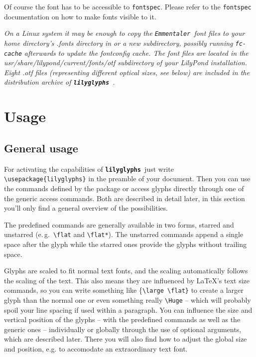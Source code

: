 \documentclass{article}
\newcommand*{\lilyglyphs}{\texttt{\textbf{lilyglyphs\,}}}
\newcommand*{\emmentaler}{\texttt{\textit{Emmentaler }}}
\newcommand*{\cmd}[1]{\texttt{\textbackslash #1}}
\begin{document}
Of course the font has to be accessible to \texttt{fontspec}. 
Please refer to the \texttt{fontspec} documentation on how to make fonts visible to it. 

\textit{On a Linux system it may be enough to copy the \emmentaler font files to your home directory's .fonts directory in or a new subdirectory, possibly running \texttt{fc-cache} afterwards to update the fontconfig cache. 
The font files are located in the usr/share/lilypond/current/fonts/otf subdirectory of your LilyPond installation. 
Eight .otf files (representing different optical sizes, see below) are included in the distribution archive of \lilyglyphs.}



\section{Usage}
\label{sec:usage}
\subsection{General usage}
\label{subsec:general_usage}
For activating the capabilities of \lilyglyphs just write \cmd{usepackage\{lilyglyphs\}} in the preamble of your document. 
Then you can use the commands defined by the package or access glyphs directly through one of the generic access commands.
Both are described in detail later, in this section you'll only find a general overview of the possibilities.

The predefined commands are generally available in two forms, starred and unstarred (e.\,g.\ \cmd{flat} and \cmd{flat*}). 
The unstarred commands append a single space after the glyph while the starred ones provide the glyphs without trailing space. 

Glyphs are scaled to fit normal text fonts, and the scaling automatically follows the scaling of the text. 
This also means they are influenced by \LaTeX 's text size commands, so you can write something like \{\cmd{large \textbackslash flat\}} to create a larger {\large \flat}glyph than the normal \flat one or even something really \cmd{Huge} {\Huge {}} -- which will probably spoil your line spacing if used within a paragraph. 
You can influence the size and vertical position of the glyphs -- with the predefined commands as well as the generic ones -- individually or globally through the use of optional arguments, which are described later.
There you will also find how to adjust the global size and position, e.g. to accomodate an extraordinary text font.
\end{document}
